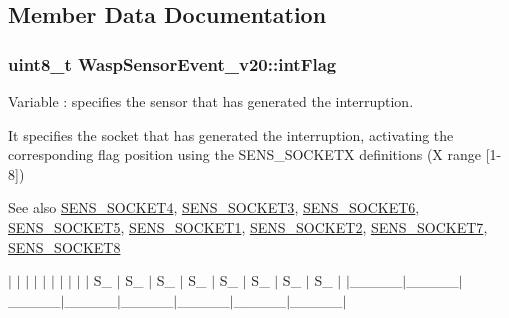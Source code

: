 \subsection{Member Data Documentation}
\subsubsection[{\texorpdfstring{int\+Flag}{intFlag}}]{\setlength{\rightskip}{0pt plus 5cm}uint8\+\_\+t Wasp\+Sensor\+Event\+\_\+v20\+::int\+Flag}\hypertarget{class_wasp_sensor_event__v20_ad0229309369664b9aacc1d4da580db1a}{}\label{class_wasp_sensor_event__v20_ad0229309369664b9aacc1d4da580db1a}


Variable \+: specifies the sensor that has generated the interruption. 

It specifies the socket that has generated the interruption, activating the corresponding flag position using the \textquotesingle{}S\+E\+N\+S\+\_\+\+S\+O\+C\+K\+E\+TX\textquotesingle{} definitions (X range \mbox{[}1-\/8\mbox{]}) \begin{DoxySeeAlso}{See also}
\hyperlink{_wasp_sensor_event__v20_8h_a14566794dbceea6d98f0f03348637843}{S\+E\+N\+S\+\_\+\+S\+O\+C\+K\+E\+T4}, \hyperlink{_wasp_sensor_event__v20_8h_ad077868897ca675b609d06214ab444d6}{S\+E\+N\+S\+\_\+\+S\+O\+C\+K\+E\+T3}, \hyperlink{_wasp_sensor_event__v20_8h_a3db83a0ba9d04a58f9db27bc33cfe737}{S\+E\+N\+S\+\_\+\+S\+O\+C\+K\+E\+T6}, \hyperlink{_wasp_sensor_event__v20_8h_a6e2abf1e3b82801f87ad80ba7c73384e}{S\+E\+N\+S\+\_\+\+S\+O\+C\+K\+E\+T5}, \hyperlink{_wasp_sensor_event__v20_8h_a80a69204778b380dd9a3a82e9e79acba}{S\+E\+N\+S\+\_\+\+S\+O\+C\+K\+E\+T1}, \hyperlink{_wasp_sensor_event__v20_8h_a7c1020bdea8fb6f46c12b895ce89e0cb}{S\+E\+N\+S\+\_\+\+S\+O\+C\+K\+E\+T2}, \hyperlink{_wasp_sensor_event__v20_8h_afc70ecba67ba0a5c1734fc1ac2365e89}{S\+E\+N\+S\+\_\+\+S\+O\+C\+K\+E\+T7}, \hyperlink{_wasp_sensor_event__v20_8h_a8a93aede80e7fca7c43644716f0aea69}{S\+E\+N\+S\+\_\+\+S\+O\+C\+K\+E\+T8} 

 $\vert$ $\vert$ $\vert$ $\vert$ $\vert$ $\vert$ $\vert$ $\vert$ $\vert$ $\vert$ S\+\_ $\vert$ S\+\_ $\vert$ S\+\_ $\vert$ S\+\_ $\vert$ S\+\_ $\vert$ S\+\_ $\vert$ S\+\_ $\vert$ S\+\_ $\vert$ $\vert$\+\_\+\+\_\+\+\_\+\+\_\+\+\_\+$\vert$\+\_\+\+\_\+\+\_\+\+\_\+\+\_\+$\vert$\+\_\+\+\_\+\+\_\+\+\_\+\+\_\+$\vert$\+\_\+\+\_\+\+\_\+\+\_\+\+\_\+$\vert$\+\_\+\+\_\+\+\_\+\+\_\+\+\_\+$\vert$\+\_\+\+\_\+\+\_\+\+\_\+\+\_\+$\vert$\+\_\+\+\_\+\+\_\+\+\_\+\+\_\+$\vert$\+\_\+\+\_\+\+\_\+\+\_\+\+\_\+$\vert$ 
\end{DoxySeeAlso}


